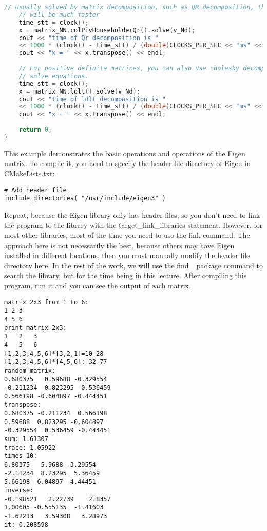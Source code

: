 \begin{lstlisting}[language=c++,caption=slambook2/ch3/useEigen/eigenMatrix.cpp]
    // Usually solved by matrix decomposition, such as QR decomposition, the speed
    // will be much faster
    time_stt = clock();
    x = matrix_NN.colPivHouseholderQr().solve(v_Nd);
    cout << "time of Qr decomposition is "
    << 1000 * (clock() - time_stt) / (double)CLOCKS_PER_SEC << "ms" << endl;
    cout << "x = " << x.transpose() << endl;
    
    // For positive definite matrices, you can also use cholesky decomposition to
    // solve equations.
    time_stt = clock();
    x = matrix_NN.ldlt().solve(v_Nd);
    cout << "time of ldlt decomposition is "
    << 1000 * (clock() - time_stt) / (double)CLOCKS_PER_SEC << "ms" << endl;
    cout << "x = " << x.transpose() << endl;
    
    return 0;
}
\end{lstlisting}

This example demonstrates the basic operations and operations of the Eigen matrix. To compile it, you need to specify the header file directory of Eigen in CMakeLists.txt:
\begin{lstlisting}[caption=slambook2/ch3/useEigen/CMakeLists.txt]
# Add header file
include_directories( "/usr/include/eigen3" )
\end{lstlisting}

Repeat, because the Eigen library only has header files, so you don't need to link the program to the library with the target\_link\_libraries statement. However, for most other libraries, most of the time you need to use the link command. The approach here is not necessarily the best, because others may have Eigen installed in different locations, then you must manually modify the header file directory here. In the rest of the work, we will use the find\_ package command to search the library, but for the time being in this lecture. After compiling this program, run it and you can see the output of each matrix.

\begin{lstlisting}[caption=Terminal input:]
% build/eigenMatrix
matrix 2x3 from 1 to 6: 
1 2 3
4 5 6
print matrix 2x3: 
1	2	3	
4	5	6	
[1,2,3;4,5,6]*[3,2,1]=10 28
[1,2,3;4,5,6]*[4,5,6]: 32 77
random matrix: 
0.680375   0.59688 -0.329554
-0.211234  0.823295  0.536459
0.566198 -0.604897 -0.444451
transpose: 
0.680375 -0.211234  0.566198
0.59688  0.823295 -0.604897
-0.329554  0.536459 -0.444451
sum: 1.61307
trace: 1.05922
times 10: 
6.80375   5.9688 -3.29554
-2.11234  8.23295  5.36459
5.66198 -6.04897 -4.44451
inverse: 
-0.198521   2.22739    2.8357
1.00605 -0.555135  -1.41603
-1.62213   3.59308   3.28973
it: 0.208598
\end{lstlisting}

